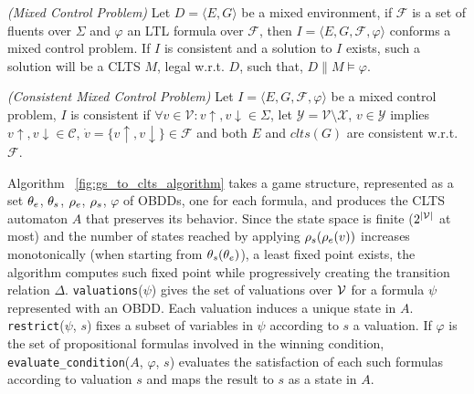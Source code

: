 \begin{definition}
	\label{def:mixed_control_problem} \emph{(Mixed Control Problem)} 
	Let $D= \langle E, G \rangle$ be a mixed environment, if $\mathcal{F}$ is a set of fluents over $\Sigma$ and $\varphi$ an LTL formula over $\mathcal{F}$, then $I = \langle E, G, \mathcal{F}, \varphi \rangle$ conforms a mixed control problem. If $I$ is consistent and a solution to $I$ exists, such a solution will be a CLTS $M$, legal w.r.t. $D$, such that, $D \parallel M \models \varphi$.
\end{definition}

\begin{definition}
	\label{def:consistent_mixed_control_problem} \emph{(Consistent Mixed Control Problem)} 
	Let $I = \langle E, G, \mathcal{F}, \varphi \rangle$ be a mixed control problem, $I$ is consistent if $\forall v \in \mathcal{V}: v\uparrow, v\downarrow \in \Sigma$, let
	$\mathcal{Y} = \mathcal{V}\setminus \mathcal{X}$, $v \in \mathcal{Y}$ implies $v\uparrow, v\downarrow \in \mathcal{C}$, $\dot{v} = \lbrace v\uparrow, v\downarrow \rbrace \in \mathcal{F}$ and both $E$ and $clts(G)$ are consistent w.r.t. $\mathcal{F}$.
\end{definition}


Algorithm ~\ref{fig:gs_to_clts_algorithm} takes a game structure, represented as a set 
${\theta_e}$, ${\theta_s}$, ${\rho_e}$, ${\rho_s}$, $\varphi$ of OBDDs, one for each formula, and produces the CLTS automaton $A$ that preserves its behavior. Since the state space is finite ($2^{|{\mathcal{V}}|}$ at most) and the number of states reached by applying ${\rho_s}({\rho_e}(v))$ increases monotonically (when starting from ${\theta_s}({\theta_e})$), a least fixed point exists, the algorithm computes such fixed point while progressively creating the transition relation $\Delta$. \texttt{valuations}($\psi$) gives the set of valuations over ${\mathcal{V}}$ for a formula $\psi$ represented with an OBDD. Each valuation induces a unique state in $A$. \texttt{restrict}($\psi$, $s$) fixes a subset of variables in $\psi$ according to $s$ a valuation. If $\varphi$ is the set of propositional formulas involved in the winning condition, \texttt{evaluate\_condition}($A$, $\varphi$, $s$) evaluates the satisfaction of each such formulas according to valuation $s$ and maps the result to $s$ as a state in $A$.
\newpage
